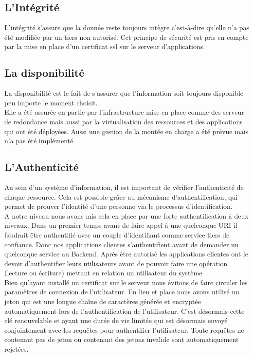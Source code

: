 \subsection{L’Intégrité}
L’intégrité s’assure que la donnée reste toujours intègre c’est-à-dire
qu’elle n’a pas été modifiée par un tiers non autorisé. Cet principe de sécurité
est pris en compte par la mise en place d’un certificat ssl sur le serveur
d’applications.
\subsection{La disponibilité}
La disponibilité est le fait de s’assurer que l’information soit toujours
disponible peu importe le moment choisit.
$ $\\Elle a été assurée en partie par l'infrastructure mise en place comme des
serveur de redondance mais aussi par la virtualisation des ressources et des
applications qui ont été déployées. Aussi une gestion de la montée en charge a
été prévue mais n’a pas été implémenté.
\subsection{L’Authenticité}
Au sein d’un système d’information, il est important de vérifier
l’authenticité de chaque ressource. Cela est possible grâce au mécanisme
d’authentification, qui permet de prouver l’identité d’une personne via le
processus d’identification.
$ $\\A notre niveau nous avons mis cela en place par une forte authentification
à deux niveaux. Dans un premier temps avant de faire appel à une quelconque
URI il faudrait être authentifié avec un couple d’identifiant comme service tiers
de confiance. Donc nos applications clientes s’authentifient avant de demander
un quelconque service au Backend. Après être autorisé les applications clientes
ont le devoir d’authentifier leurs utilisateurs avant de pouvoir faire une
opération (lecture ou écriture) mettant en relation un utilisateur du système.
$ $\\Bien qu’ayant installé un certificat sur le serveur nous évitons de faire
circuler les paramètres de connexion de l'utilisateur. En lieu et place nous avons
utilisé un jeton qui est une longue chaîne de caractères générée et encryptée
automatiquement lors de l’authentification de l’utilisateur. C’est désormais cette
clé renouvelable et ayant une durée de vie limitée qui est désormais envoyé
conjointement avec les requêtes pour authentifier l’utilisateur. Toute requêtes ne
contenant pas de jeton ou contenant des jetons invalide sont automatiquement
rejetées.
